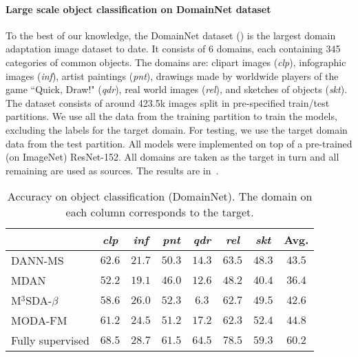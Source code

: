 \paragraph{Large scale object classification on DomainNet dataset} To the best of our knowledge, the DomainNet dataset (\citet{Peng2019}) is the largest domain adaptation image dataset to date. It consists of 6 domains, each containing 345 categories of common objects. The domains are: clipart images (\textit{clp}), infographic images (\textit{inf}), artist paintings (\textit{pnt}), drawings made by worldwide players of the game ``Quick, Draw!" (\textit{qdr}), real world images (\textit{rel}), and sketches of objects (\textit{skt}). The dataset consists of around 423.5k images split in pre-specified train/test partitions. We use all the data from the training partition to train the models, excluding the labels for the target domain. For testing, we use the target domain data from the test partition. All models were implemented on top of a pre-trained (on ImageNet) ResNet-152. All domains are taken as the target in turn and all remaining are used as sources. The results are in~.

\begin{table}[]
    \centering
    \begin{tabular}{l|cccccc:c}
        & \textit{clp} & \textit{inf} & \textit{pnt} & \textit{qdr}  & \textit{rel} & \textit{skt} & Avg. \\ \hline
        DANN-MS \cite{Ganin2015} & $\boldsymbol{62.6}$ & $21.7$  & $50.3$ & $14.3$ & $\boldsymbol{63.5}$ & $48.3$ & $43.5$ \\
        MDAN \cite{Zhao2018} & $52.2$ & $19.1$ & $46.0$ & $12.6$ & $48.2$& $40.4$ & $36.4$\\
        M$^3$SDA-$\beta$ \cite{Peng2019} & $58.6$& $\boldsymbol{26.0}$& $\boldsymbol{52.3}$ & $6.3$& $62.7$ & $49.5$ & $42.6$\\ \hline
        MODA-FM       & $61.2$ & $24.5$  & $51.2$  & $\boldsymbol{17.2}$  & $62.3$ & $\boldsymbol{52.4}$ & $\boldsymbol{44.8}$\\ \hline
        Fully supervised & $68.5$ & $28.7$ & $61.5$ & $64.5$ & $78.5$ & $59.3$ & $60.2$
    \end{tabular}
    \caption{Accuracy on object classification (DomainNet). The domain on each column corresponds to the target.}
    \label{tab:domainnet_acc}
\end{table}

